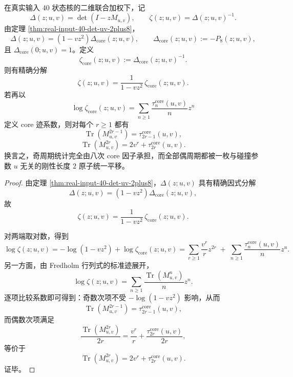 \begin{theorem}\label{thm:conclusion-realinput40-joint-zeta-lengthtwo-atom-trace-splitting}
在真实输入 \(40\) 状态核的二维联合加权下，记
\[
\Delta(z;u,v)=\det(I-zM_{u,v}),
\qquad
\zeta(z;u,v)=\Delta(z;u,v)^{-1}.
\]
由定理 \ref{thm:real-input-40-det-uv-2plus8}，
\[
\Delta(z;u,v)=(1-vz^2)\Delta_{\mathrm{core}}(z;u,v),
\qquad
\Delta_{\mathrm{core}}(z;u,v):=-P_8(z;u,v),
\]
且 \(\Delta_{\mathrm{core}}(0;u,v)=1\)。定义
\[
\zeta_{\mathrm{core}}(z;u,v):=\Delta_{\mathrm{core}}(z;u,v)^{-1}.
\]
则有精确分解
\[
\zeta(z;u,v)=\frac{1}{1-vz^2}\,\zeta_{\mathrm{core}}(z;u,v).
\]
若再以
\[
\log \zeta_{\mathrm{core}}(z;u,v)
=
\sum_{n\ge1}\frac{\tau_n^{\mathrm{core}}(u,v)}{n}z^n
\]
定义 core 迹系数，则对每个 \(r\ge 1\) 都有
\[
\operatorname{Tr}(M_{u,v}^{2r-1})=\tau_{2r-1}^{\mathrm{core}}(u,v),
\]
\[
\operatorname{Tr}(M_{u,v}^{2r})=2v^r+\tau_{2r}^{\mathrm{core}}(u,v).
\]
换言之，奇周期统计完全由八次 core 因子承担，而全部偶周期都被一枚与碰撞参数 \(u\) 无关的刚性长度 \(2\) 原子统一平移。
\end{theorem}
\begin{proof}
由定理 \ref{thm:real-input-40-det-uv-2plus8}，\(\Delta(z;u,v)\) 具有精确因式分解
\[
\Delta(z;u,v)=(1-vz^2)\Delta_{\mathrm{core}}(z;u,v),
\]
故
\[
\zeta(z;u,v)=\frac{1}{1-vz^2}\,\zeta_{\mathrm{core}}(z;u,v).
\]

对两端取对数，得到
\[
\log\zeta(z;u,v)
=
-\log(1-vz^2)+\log\zeta_{\mathrm{core}}(z;u,v)
=
\sum_{r\ge1}\frac{v^r}{r}z^{2r}
\;+\;
\sum_{n\ge1}\frac{\tau_n^{\mathrm{core}}(u,v)}{n}z^n.
\]
另一方面，由 Fredholm 行列式的标准迹展开，
\[
\log\zeta(z;u,v)
=
\sum_{n\ge1}\frac{\operatorname{Tr}(M_{u,v}^n)}{n}z^n.
\]
逐项比较系数即可得到：奇数次项不受 \(-\log(1-vz^2)\) 影响，从而
\[
\operatorname{Tr}(M_{u,v}^{2r-1})=\tau_{2r-1}^{\mathrm{core}}(u,v),
\]
而偶数次项满足
\[
\frac{\operatorname{Tr}(M_{u,v}^{2r})}{2r}
=
\frac{v^r}{r}+\frac{\tau_{2r}^{\mathrm{core}}(u,v)}{2r},
\]
等价于
\[
\operatorname{Tr}(M_{u,v}^{2r})=2v^r+\tau_{2r}^{\mathrm{core}}(u,v).
\]
证毕。
\end{proof}

